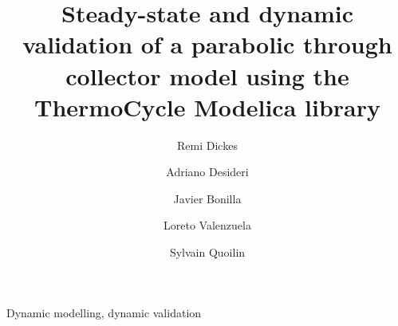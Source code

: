 \documentclass[final,3p,times,review]{elsarticle}
\begin{document}
\linenumbers
\modulolinenumbers[1]
\begin{frontmatter}



\title{Steady-state and dynamic validation of a parabolic through collector model using the ThermoCycle Modelica library}


\author[rvt]{Remi Dickes}
\author[rvt]{Adriano Desideri}
\author[focal]{Javier Bonilla}
\author[focal]{Loreto Valenzuela}
\author[rvt]{Sylvain Quoilin}

\address[rvt]{Thermodynamics laboratory, University of Li\`ege,
Campus du Sart Tilman, B49, B-4000 Li\`ege, Belgium}
\address[focal]{PSA-CIEMAT, Plataforma Solar de Almer\' ia - Centro de Investigaciones Energ\' eticas, MedioAmbientales y Tecnológicas, Crta. de Sen\' es s/n, 04200, Tabernas (Almer\' ia), Spain}
%
%
%
%
%
%
%
%
%
\address{}
%
\begin{abstract}

\end{abstract}
%
\begin{keyword}
Dynamic modelling, dynamic validation


\end{keyword}

\end{frontmatter}
\end{document}
